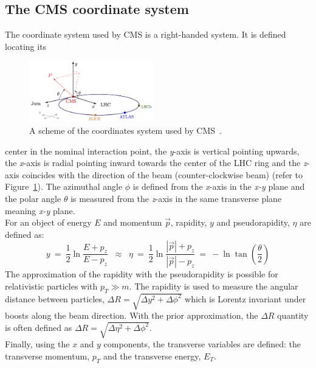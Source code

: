 \subsection{The CMS coordinate system} 
The coordinate system used by CMS is a right-handed system. It is defined
locating its 
\begin{figure}
  \begin{center}
    \includegraphics[clip,trim=0cm 0cm 0cm 0.1cm, width=0.48\textwidth]{Figures/c2/cms_coordinate_system.png}
  \end{center}
  \caption{A scheme of the coordinates system used by CMS~\cite{coordinate_cms}.}
\label{fig:coordinates}
\end{figure}
 center in the nominal interaction point, the
\emph{y}-axis is vertical pointing upwards, the \emph{x}-axis is
radial pointing inward towards the center of the LHC ring and the
\emph{z}-axis coincides with the direction of the beam
(counter-clockwise beam) (refer to
Figure~\ref{fig:coordinates}). The azimuthal angle $\phi$ is defined
from the \emph{x}-axis in the \emph{x-y} plane and the polar angle
$\theta$ is measured from the \emph{z}-axis in the same transverse
plane meaning \emph{x-y} plane.\\
For an object of energy $E$ and momentum $\overrightarrow{p}$,
rapidity, $y$ and pseudorapidity, $\eta$ are defined as:
\begin{equation}
\label{eq:pseudo}
y \: = \: \frac{1}{2} \ln \frac{E + p_z}{E - p_z} \;\; \approx \;\;
\eta \: = \: \frac{1}{2} \ln \frac{|\overrightarrow{p}| +
  p_z}{|\overrightarrow{p}| - p_z} \: = \: -\ln \tan (\frac{\theta}{2})
\end{equation}
The approximation of the rapidity with the pseudorapidity is possible for
relativistic particles with $p_{T} \gg m$. The rapidity is used to
measure the angular distance between particles, $\Delta R =
\sqrt{\Delta y ^2 + \Delta \phi ^2}$ which is Lorentz invariant under
boosts along the beam direction. With the prior approximation,
the $\Delta R$ quantity is often defined as $\Delta R =
\sqrt{\Delta \eta ^2 + \Delta \phi ^2}$.\\
Finally, using the $x$ and $y$ components, the transverse variables
are defined: the transverse momentum, $p_T$ and the transverse energy,
$E_T$.\\

